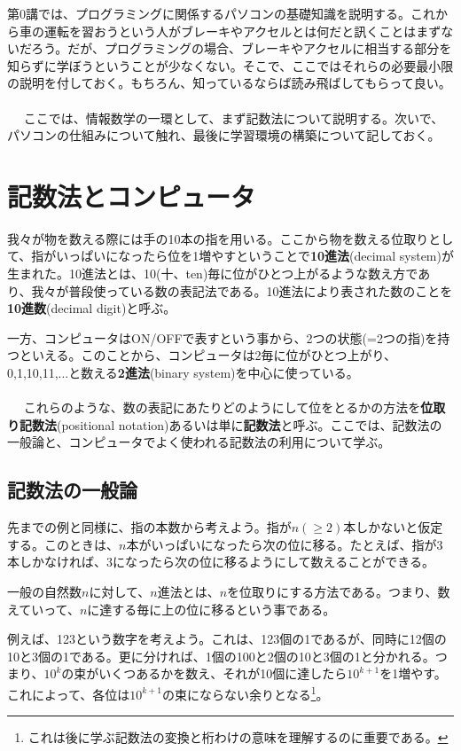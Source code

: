 第0講では、プログラミングに関係するパソコンの基礎知識を説明する。これから車の運転を習おうという人がブレーキやアクセルとは何だと訊くことはまずないだろう。だが、プログラミングの場合、ブレーキやアクセルに相当する部分を知らずに学ぼうということが少なくない。そこで、ここではそれらの必要最小限の説明を付しておく。もちろん、知っているならば読み飛ばしてもらって良い。
\\ \\　
ここでは、情報数学の一環として、まず記数法について説明する。次いで、パソコンの仕組みについて触れ、最後に学習環境の構築について記しておく。
\section{記数法とコンピュータ}
我々が物を数える際には手の10本の指を用いる。ここから物を数える位取りとして、指がいっぱいになったら位を1増やすということで\textbf{10進法}(decimal system)が生まれた。10進法とは、10(十、ten)毎に位がひとつ上がるような数え方であり、我々が普段使っている数の表記法である。10進法により表された数のことを\textbf{10進数}(decimal digit)と呼ぶ。

一方、コンピュータはON/OFFで表すという事から、2つの状態(=2つの指)を持つといえる。このことから、コンピュータは2毎に位がひとつ上がり、0,1,10,11,...と数える\textbf{2進法}(binary system)を中心に使っている。
\\ \\　
これらのような、数の表記にあたりどのようにして位をとるかの方法を\textbf{位取り記数法}(positional notation)あるいは単に\textbf{記数法}と呼ぶ。ここでは、記数法の一般論と、コンピュータでよく使われる記数法の利用について学ぶ。

\subsection{記数法の一般論}
先までの例と同様に、指の本数から考えよう。指が$n(\ge2)$本しかないと仮定する。このときは、$n$本がいっぱいになったら次の位に移る。たとえば、指が3本しかなければ、3になったら次の位に移るようにして数えることができる。

一般の自然数$n$に対して、$n$進法とは、$n$を位取りにする方法である。つまり、数えていって、$n$に達する毎に上の位に移るという事である。

例えば、123という数字を考えよう。これは、123個の1であるが、同時に12個の10と3個の1である。更に分ければ、1個の100と2個の10と3個の1と分かれる。つまり、$10^k$の束がいくつあるかを数え、それが10個に達したら$10^{k+1}$を1増やす。これによって、各位は$10^{k+1}$の束にならない余りとなる\footnote{これは後に学ぶ記数法の変換と桁わけの意味を理解するのに重要である。}。

